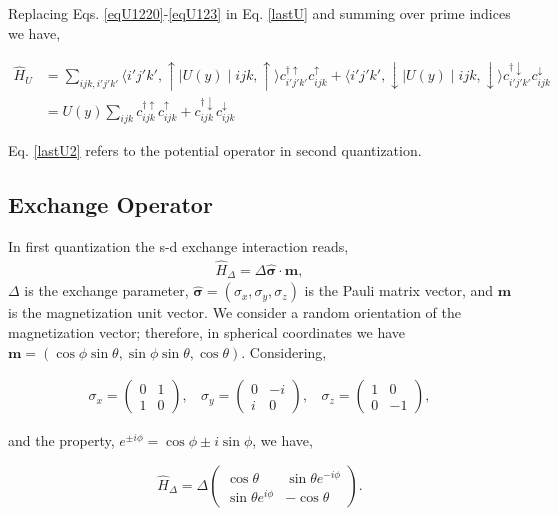 \documentclass[10pt,prb,showpacs,amssymb,floatfix]{revtex4-1}
\newcommand{\nn}{\nonumber}
\newcommand{\Dlt}{\Delta}
\newcommand{\sg}{\sigma}
\newcommand{\h}{\hat}
\begin{document}
Replacing Eqs. \eqref{eqU1220}-\eqref{eqU123} in Eq. \eqref{lastU} and summing over prime indices we have,

\begin{align}
\hat H_{U} &= \sum_{ijk,i'j'k'} \langle i'j'k',\uparrow \mid U(y) \mid ijk,\uparrow \rangle c_{i'j'k'}^{\dagger \uparrow} c_{ijk}^\uparrow  + \langle i'j'k',\downarrow \mid U(y) \mid ijk,\downarrow \rangle c_{i'j'k'}^{\dagger \downarrow} c_{ijk}^\downarrow \nn\\&= U(y) \sum_{ijk}  c_{ijk}^{\dagger \uparrow} c_{ijk}^\uparrow  +   c_{ijk}^{\dagger \downarrow} c_{ijk}^\downarrow
\label{lastU2}
\end{align}

Eq. \eqref{lastU2} refers to the potential operator in second quantization.

\subsection{Exchange Operator}

In first quantization the s-d exchange interaction reads,
\begin{align}
\hat H_{\Dlt} = \Dlt \bm{\h \sigma}\cdot \bm m,
\label{sd1st}
\end{align}
$\Dlt$ is the exchange parameter, $\bm{\h \sigma} = (\sg_x, \sg_y, \sg_z)$ is the Pauli matrix vector, and $\bm m$ is the magnetization unit vector. We consider a random orientation of the magnetization vector; therefore, in spherical coordinates we have $\bm m = (\cos \phi \sin \theta, \sin\phi \sin\theta, \cos \theta)$. Considering,

\begin{align}
 {\sigma_x} = \begin{pmatrix} 0 & 1 \\ 1 & 0 \end{pmatrix} , ~  ~  ~  ~ {\sigma_y} = \begin{pmatrix} 0 & -i \\ i & 0 \end{pmatrix}, ~  ~  ~  ~   {\sigma_z} =  \begin{pmatrix} 1 & 0 \\ 0 & -1 \end{pmatrix}, 
\label{Pauli}
\end{align}

and the property, $e^{\pm i\phi} = \cos\phi \pm i \sin\phi$, we have,

\begin{equation}
\hat H_{\Dlt} =  \Dlt \left(\begin{array}{cc} 
\cos\theta & \sin\theta e^{-i\phi}\\
\sin\theta e^{i\phi} & -\cos\theta
\end{array}\right).
\label{sd1st2}
\end{equation}
\end{document}
